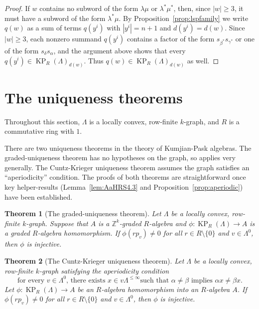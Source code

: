 \documentclass[a4paper,12pt]{amsart}
\numberwithin{equation}{section}
\newtheorem{thm}{Theorem}[section]
\theoremstyle{definition}
\theoremstyle{remark}
\begin{document}
\begin{proof}
If $w$ contains no subword of the form $\lambda\mu$ or $\lambda^*\mu^*$, then, since $|w|\geq 3$, it must have a subword of the form $\lambda^*\mu$. By Proposition~\ref{prop:lspfamily} we write $q(w)$ as a sum of terms $q(y^i)$ with $|y^i|=n+1$ and $d(y^i)=d(w)$. Since $|w|\geq 3$, each nonzero summand $q(y^i)$ contains a factor of the form $s_{\beta^*}s_{\gamma^*}$ or one of the form $s_{\delta}s_\alpha$, and the argument above shows that every $q(y^i)\in \operatorname{KP}_R(\Lambda)_{d(w)}$. Thus  $q(w)\in \operatorname{KP}_R(\Lambda)_{d(w)}$ as well.
\end{proof}

\section{The uniqueness theorems}\label{sec-uniquenessthms}
Throughout this section, $\Lambda$ is a locally convex, row-finite $k$-graph, and $R$ is a commutative ring with $1$.

There are two uniqueness theorems in the theory of Kumjian-Pask algebras.  The graded-uniqueness theorem has no hypotheses on the graph, so 
applies very generally.  The Cuntz-Krieger uniqueness theorem assumes the graph satisfies an ``aperiodicity'' condition. 
The proofs of both theorems are straightforward once key helper-results (Lemma~\ref{lem:AaHRS4.3} and Proposition~\ref{prop:aperiodic}) have been established. 

\begin{thm}[The graded-uniqueness theorem]\label{gut} Let $\Lambda$ be a locally convex, row-finite $k$-graph. 
  Suppose that $A$ is a ${\mathbb{Z}}^k$-graded $R$-algebra and 
$\phi:\operatorname{KP}_R(\Lambda) \to A$ is a graded $R$-algebra 
homomorphism. If $\phi(rp_v)\neq 0$ for all $r \in R \setminus \{0\}$ and $v \in \Lambda^0$, 
then $\phi$ is injective.
\end{thm}

\begin{thm}[The Cuntz-Krieger uniqueness theorem]\label{ckthm}
Let $\Lambda$ be a locally convex, row-finite $k$-graph satisfying the aperiodicity condition 
\begin{equation}\label{eq:aperiodic}
\text{for every $v \in \Lambda^0$, there exists $x\in v\Lambda^{\leq \infty}$
such that $\alpha \neq \beta$  implies $\alpha x \neq \beta x$.}
\end{equation}
Let $\phi:\operatorname{KP}_R(\Lambda) \to A$ 
be an $R$-algebra homomorphism into an $R$-algebra $A$. If $\phi(rp_v) \neq 0$ for all $r \in R \setminus \{0\}$ and 
$v \in \Lambda^0$, then $\phi$ is injective.
\end{thm}
\end{document}
